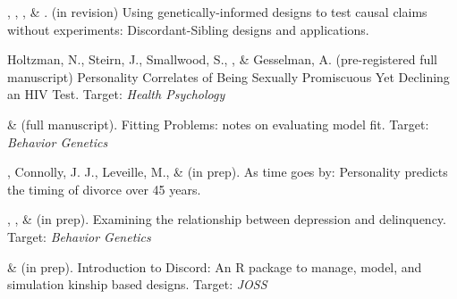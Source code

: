 



\item \meb, \jt, \yrh, \& \joe. (in revision) Using genetically-informed designs to test causal claims without experiments: Discordant-Sibling designs and applications. \href{https://osf.io/zpdwt/}{\small\color{blue}{osf.io/zpdwt/}}%

\item Holtzman, N., Steirn, J., Smallwood, S., \meb, \& Gesselman, A. (pre-registered full manuscript) Personality Correlates of Being Sexually Promiscuous Yet Declining an HIV Test. Target: \textit{Health Psychology}

\item \meb \& \joe (full  manuscript). Fitting Problems: notes on evaluating model fit. Target: \textit{Behavior Genetics}


\item \meb, Connolly, J. J., Leveille, M., \& \jjj (in prep). As time goes by: Personality predicts the timing of divorce over 45 years.%
%
\item \emsims, \jt, \& \meb (in prep). Examining the relationship between depression and delinquency. Target: \textit{Behavior Genetics}


\item \jt \& \meb (in prep). Introduction to Discord: An R package to manage, model, and simulation kinship based designs. Target: \textit{JOSS}







